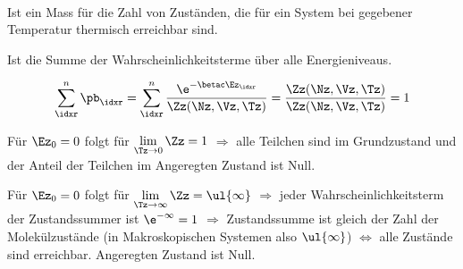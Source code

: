 \begin{defnbox}\nospacing
  \begin{defn}[Zustandssumme]\leavevmode \\
    \begin{numberlist}
        \item Ist ein Mass für die Zahl von Zuständen, die für ein System bei gegebener
    Temperatur thermisch erreichbar sind.
      \item Ist die Summe der Wahrscheinlichkeitsterme über alle Energieniveaus.
    \end{numberlist}
  \end{defn}
\end{defnbox}
\begin{notebox}[Eigenschaften]\nospacing
  \begin{numberlist}
    \item
      \begin{align*}
        \sum_{\idxr}^{n}\pb_{\idxr}=\sum_{\idxr}^{n}\frac{\e^{-\betac\Ez_{\idxr}}}{\Zz(\Nz,\Vz,\Tz)}=\frac{\Zz(\Nz,\Vz,\Tz)}{\Zz(\Nz,\Vz,\Tz)}=1
      \end{align*}
        \item Für $\Ez_0=0$ folgt für $\lim\limits_{\Tz\to0}\Zz=1$ $\Rightarrow$ alle Teilchen sind im Grundzustand und der Anteil der Teilchen im
      Angeregten Zustand ist Null.
        \item Für $\Ez_0=0$ folgt für $\lim\limits_{\Tz\to\infty}\Zz=\ul{\infty}$ $\Rightarrow$ jeder Wahrscheinlichkeitsterm der Zustandssummer ist $\e^{-\infty}=1$
      $\Rightarrow$ Zustandssumme ist gleich der Zahl der Molekülzustände (in Makroskopischen Systemen also $\ul{\infty}$) $\iff$ alle Zustände sind erreichbar.
      Angeregten Zustand ist Null.
  \end{numberlist}
\end{notebox}
